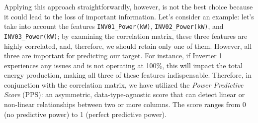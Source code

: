 Applying this approach straightforwardly, however, is not the best choice because it
could lead to the loss of important information.
Let's consider an example: let's take into account the features \verb|INV01_Power(kW)|,
\verb|INV02_Power(kW)|, and \verb|INV03_Power(kW)|; by examining the correlation matrix, these
three features are highly correlated, and, therefore, we should retain only one of them.
However, all three are important for predicting our target.
For instance, if Inverter 1 experiences any issues and is not operating at 100\%,
this will impact the total energy production, making all three of these
features indispensable. Therefore, in conjunction with the correlation matrix,
we have utilized the \textit{Power Predictive Score} (PPS): an asymmetric,
data-type-agnostic score that can detect linear or non-linear relationships
between two or more columns. The score ranges from 0 (no predictive power)
to 1 (perfect predictive power).

